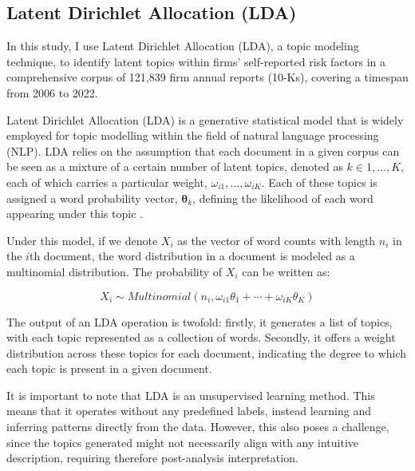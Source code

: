 \documentclass[12pt, letterpaper]{article}
\begin{document}
\subsection{Latent Dirichlet Allocation (LDA)}

In this study, I use Latent Dirichlet Allocation (LDA), a topic modeling technique, to identify latent topics within firms' self-reported risk factors in a comprehensive corpus of 121,839 firm annual reports (10-Ks), covering a timespan from 2006 to 2022.


Latent Dirichlet Allocation (LDA) is a generative statistical model that is widely employed for topic modelling within the field of natural language processing (NLP). LDA relies on the assumption that each document in a given corpus can be seen as a mixture of a certain number of latent topics, denoted as $k \in {1, ..., K}$, each of which carries a particular weight, $\omega_{i1}, ..., \omega_{iK}$. Each of these topics is assigned a word probability vector, $\mathbf{\theta}_k$, defining the likelihood of each word appearing under this topic \citep{Blei2003-ay}.

Under this model, if we denote $X_i$ as the vector of word counts with length $n_i$ in the $i$th document, the word distribution in a document is modeled as a multinomial distribution. The probability of $X_i$ can be written as:

\begin{equation}
X_i \sim Multinomial\left(n_i, \omega_{i 1} \theta_1+\cdots+\omega_{i K} \theta_K\right)
\end{equation}


The output of an LDA operation is twofold: firstly, it generates a list of topics, with each topic represented as a collection of words. Secondly, it offers a weight distribution across these topics for each document, indicating the degree to which each topic is present in a given document.

It is important to note that LDA is an unsupervised learning method. This means that it operates without any predefined labels, instead learning and inferring patterns directly from the data. However, this also poses a challenge, since the topics generated might not necessarily align with any intuitive description, requiring therefore post-analysis interpretation. %
\end{document}
